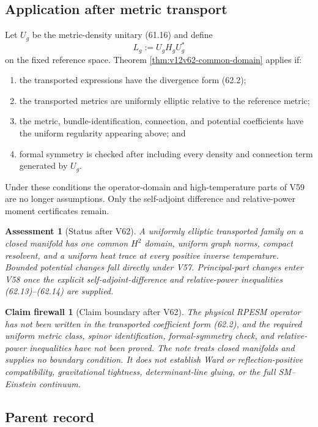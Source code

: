 \documentclass[11pt]{article}
\newtheorem{firewall}[theorem]{Claim firewall}
\newtheorem{assessment}[theorem]{Assessment}
\theoremstyle{remark}
\begin{document}
\subsection{Application after metric transport}

Let \(U_g\) be the metric-density unitary (61.16) and define
\[
                         L_g:=U_gH_gU_g^*
\]
on the fixed reference space.  Theorem
\ref{thm:v12v62-common-domain} applies if:
\begin{enumerate}
\item the transported expressions have the divergence form (62.2);
\item the transported metrics are uniformly elliptic relative to
the reference metric;
\item the metric, bundle-identification, connection, and potential
coefficients have the uniform regularity appearing above; and
\item formal symmetry is checked after including every density and
connection term generated by \(U_g\).
\end{enumerate}
Under these conditions the operator-domain and high-temperature
parts of V59 are no longer assumptions.  Only the self-adjoint
difference and relative-power moment certificates remain.

\begin{assessment}[Status after V62]
\label{ass:v12v62-status}
A uniformly elliptic transported family on a closed manifold has one
common \(H^2\) domain, uniform graph norms, compact resolvent, and a
uniform heat trace at every positive inverse temperature.  Bounded
potential changes fall directly under V57.  Principal-part changes
enter V58 once the explicit self-adjoint-difference and
relative-power inequalities (62.13)--(62.14) are supplied.
\end{assessment}

\begin{firewall}[Claim boundary after V62]
\label{fire:v12v62-claim}
The physical RPESM operator has not been written in the transported
coefficient form (62.2), and the required uniform metric class,
spinor identification, formal-symmetry check, and relative-power
inequalities have not been proved.  The note treats closed
manifolds and supplies no boundary condition.  It does not establish
Ward or reflection-positive compatibility, gravitational
tightness, determinant-line gluing, or the full SM--Einstein
continuum.
\end{firewall}

\subsection{Parent record}
\end{document}
